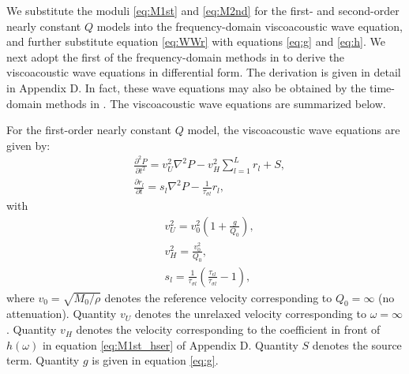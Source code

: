 \documentclass[article]{./macros/elsarticle_qh}
\begin{document}
We substitute the moduli \ref{eq:M1st} and \ref{eq:M2nd} for the first- and second-order nearly constant $Q$ models into the frequency-domain viscoacoustic wave equation, and further substitute equation \ref{eq:WWr} with equations \ref{eq:g} and \ref{eq:h}. We next adopt the first of the frequency-domain methods in \cite{hao.greenhalgh:2019} to derive the viscoacoustic wave equations in differential form. The derivation is given in detail in Appendix D. In fact, these wave equations may also be obtained by the time-domain methods in \cite{hao.greenhalgh:2019}. The viscoacoustic wave equations are summarized below.
  
For the first-order nearly constant $Q$ model, the viscoacoustic wave equations are given by:
\begin{equation} \label{eq:VWE1}
\begin{split}
& \frac{\partial^2 P}{\partial t^2} = v_{U}^2 \nabla^2 P
- v_{H}^2 \sum_{l=1}^{L} r_{l} 
+ S , \\
& \frac{\partial r_{l}}{\partial t} = s_{l} \nabla^2 P
- \frac{1}{\tau_{\sigma l}} r_{l} ,
\end{split}
\end{equation}
with
\begin{align}
& v_{U}^2 = v_{0}^2 \left(
1 + \frac{g}{Q_{0}} \right),              \\
& v_{H}^2 = \frac{v_{0}^2}{Q_{0}},       \\
\label{eq:sl}
& s_{l} = \frac{1}{\tau_{\sigma l}} 
\left(\frac{\tau_{\epsilon l}}{\tau_{\sigma l}} - 1 \right) , 
\end{align}
where $v_{0} = \sqrt{M_{0}/\rho}$ denotes the reference velocity corresponding to $Q_{0}=\infty$ (no attenuation). Quantity $v_{U}$ denotes the unrelaxed velocity corresponding to $\omega=\infty$.  Quantity $v_{H}$ denotes the velocity corresponding to the coefficient in front of $h(\omega)$ in equation \ref{eq:M1st_hser} of Appendix D. Quantity $S$ denotes the source term. Quantity $g$ is given in equation \ref{eq:g}. 
\end{document}
